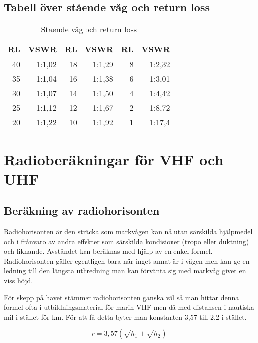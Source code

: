\subsection{Tabell över stående våg och return loss}

\begin{table}[H]
\centering
\begin{tabular}{rr|rr|rr}
	\textbf{RL} & \textbf{VSWR} & \textbf{RL} & \textbf{VSWR} & \textbf{RL} & \textbf{VSWR} \\ \hline
	         40 &        1:1,02 &          18 &        1:1,29 &           8 &        1:2,32 \\
	         35 &        1:1,04 &          16 &        1:1,38 &           6 &        1:3,01 \\
	         30 &        1:1,07 &          14 &        1:1,50 &           4 &        1:4,42 \\
	         25 &        1:1,12 &          12 &        1:1,67 &           2 &        1:8,72 \\
	         20 &        1:1,22 &          10 &        1:1,92 &           1 &        1:17,4
\end{tabular}
\caption{Stående våg och return loss}
\label{tab:vswr-rl}
\end{table}

\section{Radioberäkningar för VHF och UHF}

\subsection{Beräkning av radiohorisonten}

Radiohorisonten är den sträcka som markvågen kan nå utan särskilda hjälpmedel
och i frånvaro av andra effekter som särskilda kondisioner (tropo eller
duktning) och liknande. Avståndet kan beräknas med hjälp av en enkel formel.
Radiohorisonten gäller egentligen bara när inget annat är i vägen men kan ge
en ledning till den längsta utbredning man kan förvänta sig med markvåg givet
en viss höjd.

För skepp på havet stämmer radiohorisonten ganska väl så man hittar denna
formel ofta i utbildningsmaterial för marin VHF men då med distansen i
nautiska mil i stället för km. För att få detta byter man konstanten 3,57 till
2,2 i stället.

\begin{equation}
	r = 3,57 \left(\sqrt{h_1}+\sqrt{h_2}\right)
\end{equation}


